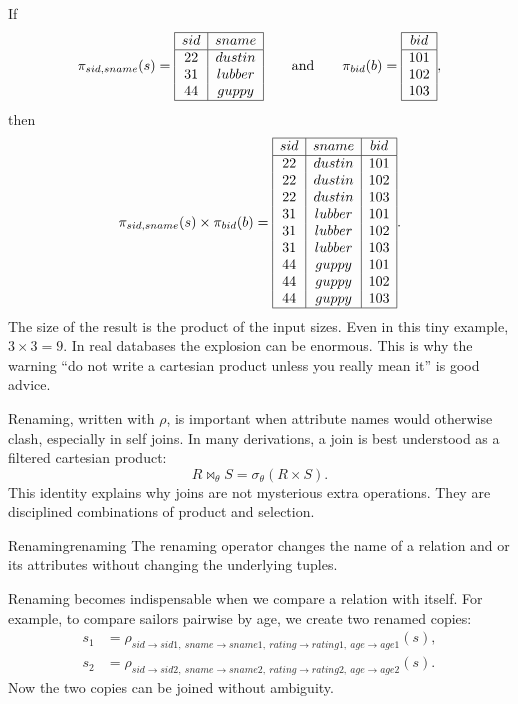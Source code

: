 \documentclass[11pt,a4paper,openany]{book}
\newcommand{\RAselect}{\sigma}
\newcommand{\RAproject}{\pi}
\newcommand{\RArename}{\rho}
\newcommand{\join}{\bowtie}
\begin{document}
If
\[
\RAproject_{sid,sname}(s)=
\begin{array}{|c|c|}\hline
sid&sname\\\hline
22&dustin\\
31&lubber\\
44&guppy\\\hline
\end{array}
\qquad\text{and}\qquad
\RAproject_{bid}(b)=
\begin{array}{|c|}\hline
bid\\\hline
101\\102\\103\\\hline
\end{array},
\]
then
\[
\RAproject_{sid,sname}(s)\times \RAproject_{bid}(b)=
\begin{array}{|c|c|c|}\hline
sid&sname&bid\\\hline
22&dustin&101\\
22&dustin&102\\
22&dustin&103\\
31&lubber&101\\
31&lubber&102\\
31&lubber&103\\
44&guppy&101\\
44&guppy&102\\
44&guppy&103\\\hline
\end{array}.
\]
The size of the result is the product of the input sizes. Even in this tiny example, \(3\times 3=9\). In real databases the explosion can be enormous. This is why the warning ``do not write a cartesian product unless you really mean it'' is good advice.

Renaming, written with \(\RArename\), is important when attribute names would otherwise clash, especially in self joins. In many derivations, a join is best understood as a filtered cartesian product:
\[
R \join_{\theta} S = \RAselect_{\theta}(R \times S).
\]
This identity explains why joins are not mysterious extra operations. They are disciplined combinations of product and selection.

\begin{definition}{Renaming}{renaming}
The renaming operator changes the name of a relation and or its attributes without changing the underlying tuples.
\end{definition}

Renaming becomes indispensable when we compare a relation with itself. For example, to compare sailors pairwise by age, we create two renamed copies:
\[
\begin{aligned}
s_1&=\RArename_{sid\to sid1,\ sname\to sname1,\ rating\to rating1,\ age\to age1}(s),\\
s_2&=\RArename_{sid\to sid2,\ sname\to sname2,\ rating\to rating2,\ age\to age2}(s).
\end{aligned}
\]
Now the two copies can be joined without ambiguity.
\end{document}
